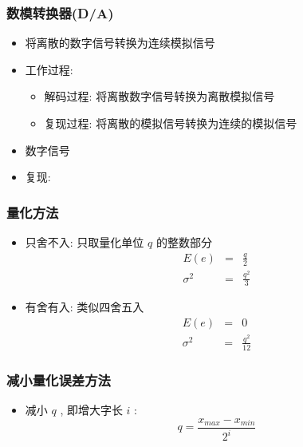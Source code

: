 \documentclass[table]{article}
\begin{document}
\begin{frame}
\frametitle{数模转换器(D/A)}
\label{sec-1-3-3}

\begin{itemize}
\item 将离散的数字信号转换为连续模拟信号
\item <2->工作过程:
\begin{itemize}
\item 解码过程: 将离散数字信号转换为离散模拟信号
\item 复现过程: 将离散的模拟信号转换为连续的模拟信号
\end{itemize}
\end{itemize}
\begin{itemize}

\item 数字信号
\label{sec-1-3-3-1}%

\item 复现:
\label{sec-1-3-3-2}%

\end{itemize} %
\end{frame}
\begin{frame}
\frametitle{量化方法}
\label{sec-1-3-4}

\begin{itemize}
\item <2->只舍不入: 只取量化单位  $q$  的整数部分
       	\begin{eqnarray*}
	 E(e) &=& \frac{q}{2} \\
	 \sigma^2 &=& \frac{q^2}{3}
       	\end{eqnarray*}
\item <3->有舍有入: 类似四舍五入
       	\begin{eqnarray*}
	 E(e) &=& 0 \\
	 \sigma^2 &=& \frac{q^2}{12}
       	\end{eqnarray*}
\end{itemize}
\end{frame}
\begin{frame}
\frametitle{减小量化误差方法}
\label{sec-1-3-5}

\begin{itemize}
\item 减小  $q$  , 即增大字长  $i$  :   
         \[q=\frac{x_{max}-x_{min}}{2^i}\]
\end{itemize}
\end{frame}
\end{document}
